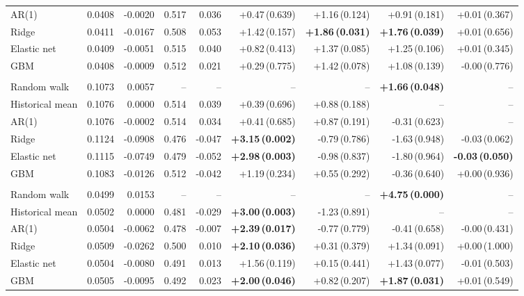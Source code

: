 \begin{tabular}{lrrrrrrrr}
\quad AR(1) & 0.0408 & -0.0020 & 0.517 & 0.036 & +0.47\,(0.639) & +1.16\,(0.124) & +0.91\,(0.181) & +0.01\,(0.367) \\
\quad Ridge & 0.0411 & -0.0167 & 0.508 & 0.053 & +1.42\,(0.157) & \textbf{+1.86\,(0.031)} & \textbf{+1.76\,(0.039)} & +0.01\,(0.656) \\
\quad Elastic net & 0.0409 & -0.0051 & 0.515 & 0.040 & +0.82\,(0.413) & +1.37\,(0.085) & +1.25\,(0.106) & +0.01\,(0.345) \\
\quad GBM & 0.0408 & -0.0009 & 0.512 & 0.021 & +0.29\,(0.775) & +1.42\,(0.078) & +1.08\,(0.139) & -0.00\,(0.776) \\
\addlinespace
\multicolumn{9}{l}{\emph{ETH, $h=7$}} \\
\quad Random walk & 0.1073 & 0.0057 & -- & -- & -- & -- & \textbf{+1.66\,(0.048)} & -- \\
\quad Historical mean & 0.1076 & 0.0000 & 0.514 & 0.039 & +0.39\,(0.696) & +0.88\,(0.188) & -- & -- \\
\quad AR(1) & 0.1076 & -0.0002 & 0.514 & 0.034 & +0.41\,(0.685) & +0.87\,(0.191) & -0.31\,(0.623) & -- \\
\quad Ridge & 0.1124 & -0.0908 & 0.476 & -0.047 & \textbf{+3.15\,(0.002)} & -0.79\,(0.786) & -1.63\,(0.948) & -0.03\,(0.062) \\
\quad Elastic net & 0.1115 & -0.0749 & 0.479 & -0.052 & \textbf{+2.98\,(0.003)} & -0.98\,(0.837) & -1.80\,(0.964) & \textbf{-0.03\,(0.050)} \\
\quad GBM & 0.1083 & -0.0126 & 0.512 & -0.042 & +1.19\,(0.234) & +0.55\,(0.292) & -0.36\,(0.640) & +0.00\,(0.936) \\
\addlinespace
\multicolumn{9}{l}{\emph{SOL, $h=1$}} \\
\quad Random walk & 0.0499 & 0.0153 & -- & -- & -- & -- & \textbf{+4.75\,(0.000)} & -- \\
\quad Historical mean & 0.0502 & 0.0000 & 0.481 & -0.029 & \textbf{+3.00\,(0.003)} & -1.23\,(0.891) & -- & -- \\
\quad AR(1) & 0.0504 & -0.0062 & 0.478 & -0.007 & \textbf{+2.39\,(0.017)} & -0.77\,(0.779) & -0.41\,(0.658) & -0.00\,(0.431) \\
\quad Ridge & 0.0509 & -0.0262 & 0.500 & 0.010 & \textbf{+2.10\,(0.036)} & +0.31\,(0.379) & +1.34\,(0.091) & +0.00\,(1.000) \\
\quad Elastic net & 0.0504 & -0.0080 & 0.491 & 0.013 & +1.56\,(0.119) & +0.15\,(0.441) & +1.43\,(0.077) & -0.01\,(0.503) \\
\quad GBM & 0.0505 & -0.0095 & 0.492 & 0.023 & \textbf{+2.00\,(0.046)} & +0.82\,(0.207) & \textbf{+1.87\,(0.031)} & +0.01\,(0.549) \\

\end{tabular}
